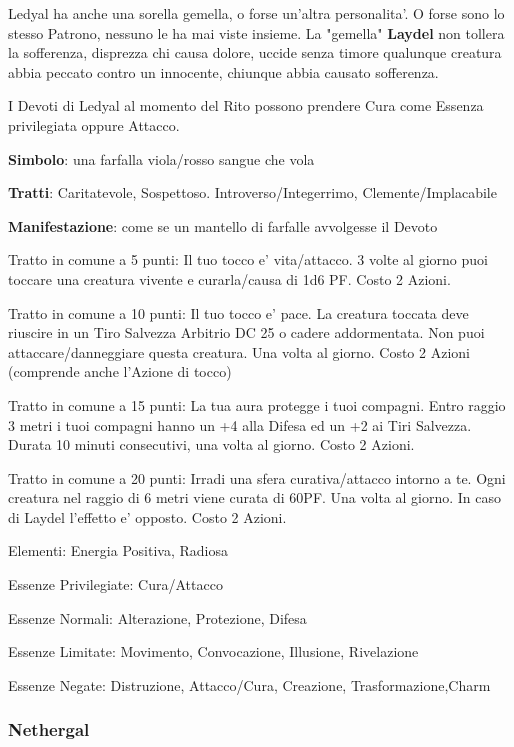 \documentclass[a4paper,11pt,twoside,openany]{book}
\begin{document}
{Ledyal ha anche una sorella gemella, o forse un'altra personalita'. O forse sono lo stesso Patrono, nessuno le ha mai viste insieme. La "gemella" \textbf{Laydel} non tollera la sofferenza, disprezza chi causa dolore, uccide senza timore qualunque creatura abbia peccato contro un innocente, chiunque abbia causato sofferenza.

I Devoti di Ledyal al momento del Rito possono prendere Cura come Essenza privilegiata oppure Attacco.

\textbf{Simbolo}: una farfalla viola/rosso sangue che vola

\textbf{Tratti}: Caritatevole, Sospettoso. Introverso/Integerrimo, Clemente/Implacabile

\textbf{Manifestazione}: come se un mantello di farfalle avvolgesse il Devoto

\bigskip

Tratto in comune a 5 punti: Il tuo tocco e' vita/attacco. 3 volte al giorno puoi toccare una creatura vivente e curarla/causa di 1d6 PF. Costo 2 Azioni.

Tratto in comune a 10 punti: Il tuo tocco e' pace. La creatura toccata deve riuscire in un Tiro Salvezza Arbitrio DC 25 o cadere addormentata. Non puoi attaccare/danneggiare questa creatura. Una volta al giorno. Costo 2 Azioni (comprende anche l'Azione di tocco)

Tratto in comune a 15 punti: La tua aura protegge i tuoi compagni. Entro raggio 3 metri i tuoi compagni hanno un +4 alla Difesa ed un +2 ai Tiri Salvezza. Durata 10 minuti consecutivi, una volta al giorno. Costo 2 Azioni.

Tratto in comune a 20 punti: Irradi una sfera curativa/attacco intorno a te. Ogni creatura nel raggio di 6 metri viene curata di 60PF. Una volta al giorno. In caso di Laydel l'effetto e' opposto. Costo 2 Azioni.

\bigskip

Elementi: Energia Positiva, Radiosa

\bigskip

Essenze Privilegiate: Cura/Attacco

Essenze Normali: Alterazione, Protezione, Difesa

Essenze Limitate: Movimento, Convocazione, Illusione, Rivelazione

Essenze Negate: Distruzione, Attacco/Cura, Creazione, Trasformazione,Charm

\subsubsection{Nethergal}

}
\end{document}
